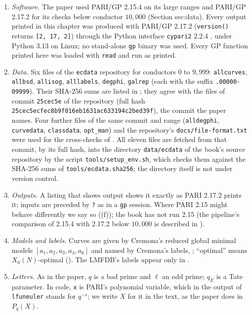 \begin{sloppypar}
\begin{convention}\label{conv:computation:versions}
\begin{enumerate}[label=(\alph*)]
\item \emph{Software.} The paper used PARI/GP 2.15.4 \cite{PARI} on its large ranges and PARI/GP 2.17.2 \cite{PARI217} for its checks below
conductor $10{,}000$ (Section sec:data). Every output printed in this chapter was produced with PARI/GP 2.17.2
(\texttt{version()} returns \texttt{[2, 17, 2]}) through the Python interface \texttt{cypari2} 2.2.4 \cite{cypari2}, under Python 3.13 on
Linux; no stand-alone \texttt{gp} binary was used. Every GP function printed here was loaded with \texttt{read} and run as printed.
\item \emph{Data.} Six files of the \texttt{ecdata} repository \cite{ecdata} for conductors $0$ to $9{,}999$:
\texttt{allcurves}, \texttt{allbsd}, \texttt{allisog}, \texttt{alllabels}, \texttt{degphi}, \texttt{galrep} (each with the suffix
\texttt{.00000-09999}). Their SHA-256 sums are listed in ; they agree with the files of commit
\texttt{25cec5e} of the repository (full hash \texttt{25cec5ecfec8b9f016eb1631ac633194c2bed39f}), the commit the
paper names. Four further files of the same commit and range (\texttt{alldegphi}, \texttt{curvedata}, \texttt{classdata},
\texttt{opt\_man}) and the repository's \texttt{docs/\allowbreak file-format.txt} were used for the cross-checks of .
All eleven files are fetched from that commit, by its full hash, into the directory \texttt{data/ecdata} of the book's source repository by the
script \texttt{tools/setup\_env.sh}, which checks them against the SHA-256 sums of \texttt{tools/ecdata.sha256}; the directory itself is not
under version control.
\item \emph{Outputs.} A listing that shows output shows it exactly as PARI 2.17.2 prints it; inputs are preceded by \texttt{?} as in a
\texttt{gp} session. Where PARI 2.15 might behave differently we say so ((f)); the book has not run 2.15 (the
pipeline's comparison of 2.15.4 with 2.17.2 below $10{,}000$ is described in ).
\item \emph{Models and labels.} Curves are given by Cremona's reduced global minimal models $[a_1,a_2,a_3,a_4,a_6]$ and named by Cremona's
labels, ; ``optimal'' means $X_0(N)$-optimal (). The LMFDB's labels appear only in
.
\item \emph{Letters.} As in the paper, $q$ is a bad prime and $\ell$ an odd prime; $q_E$ is a Tate parameter. In code, \texttt{x} is
PARI's polynomial variable, which in the output of \texttt{lfuneuler} stands for $q^{-s}$; we write $X$ for it in the text, as the paper
does in $P_q(X)$.
\end{enumerate}
\end{convention}


\end{sloppypar}
